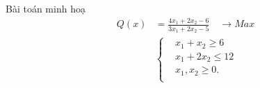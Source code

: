 \documentclass{beamer}
\begin{document}
\begin{frame}{Bài toán minh hoạ}
    \begin{equation}
    \begin{split}
    \quad Q(x) & = \frac{4x_1+2x_2-6}{3x_1+2x_2-5} \quad \longrightarrow Max \\
        & \left\{
        \begin{split}
        & x_1 + x_2 \geq 6 \\
        & x_1 + 2x_2 \leq 12 \\
        &x_1, x_2 \geq 0. \\
        \end{split}\right.    
    \end{split}
    \end{equation}            
\end{frame}
\end{document}
